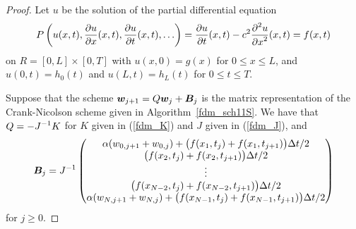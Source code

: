\begin{proof}
Let $u$ be the solution of the partial differential equation
\[
P\left(u(x,t), \frac{\partial{u}}{\partial{x}}(x,t), \frac{\partial{u}}{\partial{t}}(x,t), \ldots\right) =
\frac{\partial{u}}{\partial{t}}(x,t) - c^2 \frac{\displaystyle \partial^{2}{u}} {\displaystyle \partial{x}^{2}}(x,t) = f(x,t)
\]
on $R=[0,L]\times [0,T]$ with $u(x,0) = g(x)$ for $0\leq x \leq L$, and
$u(0,t) = h_0(t)$ and $u(L,t) = h_L(t)$ for $0\leq t \leq T$.

Suppose that the scheme $\bm{w}_{j+1} = Q\bm{w}_j + \bm{B}_j$ is
the matrix representation of the Crank-Nicolson scheme given in
Algorithm~\ref{fdm_sch11S}.  We have that
$\displaystyle Q = -J^{-1}K$ for $K$ given
in (\ref{fdm_K}) and $J$ given in (\ref{fdm_J}), and 
\[
\bm{B}_j = J^{-1} \begin{pmatrix}
\alpha (w_{0,j+1} + w_{0,j})
+ \big( f(x_1,t_j) + f(x_1,t_{j+1})\big)\Delta{t}/2 \\
\big( f(x_2,t_j)  + f(x_2,t_{j+1})\big)\Delta{t}/2 \\
\vdots \\
\big( f(x_{N-2},t_j) + f(x_{N-2},t_{j+1})\big)\Delta{t}/2 \\
\alpha (w_{N,j+1} + w_{N,j})
+ \big( f(x_{N-1},t_j) + f(x_{N-1},t_{j+1})\big)\Delta{t}/2
\end{pmatrix}
\]
for $j\geq 0$.


\end{proof}
